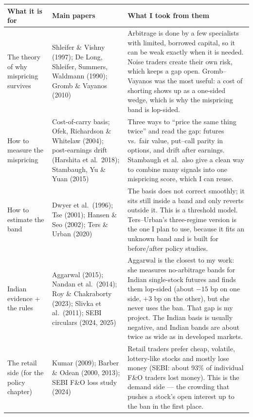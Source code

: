 \documentclass[11pt]{article}
\begin{document}
\begin{center}
\footnotesize
\begin{tabular}{p{2.9cm} p{4.1cm} p{7.1cm}}
\toprule
\textbf{What it is for} & \textbf{Main papers} & \textbf{What I took from them} \\
\midrule
The theory of why mispricing survives & Shleifer \& Vishny (1997); De Long, Shleifer, Summers, Waldmann (1990); Gromb \& Vayanos (2010) & Arbitrage is done by a few specialists with limited, borrowed capital, so it can be weak exactly when it is needed. Noise traders create their own risk, which keeps a gap open. Gromb--Vayanos was the most useful: a cost of shorting shows up as a one-sided wedge, which is why the mispricing band is lop-sided. \\
\addlinespace
How to measure the mispricing & Cost-of-carry basis; Ofek, Richardson \& Whitelaw (2004); post-earnings drift (Harshita et al.\ 2018); Stambaugh, Yu \& Yuan (2015) & Three ways to ``price the same thing twice'' and read the gap: futures vs.\ fair value, put--call parity in options, and drift after earnings. Stambaugh et al.\ also give a clean way to combine many signals into one mispricing score, which I can reuse. \\
\addlinespace
How to estimate the band & Dwyer et al.\ (1996); Tse (2001); Hansen \& Seo (2002); Ters \& Urban (2020) & The basis does not correct smoothly; it sits still inside a band and only reverts outside it. This is a threshold model. Ters--Urban's three-regime version is the one I plan to use, because it fits an unknown band and is built for before/after policy studies. \\
\addlinespace
Indian evidence + the rules & Aggarwal (2015); Nandan et al.\ (2014); Roy \& Chakraborty (2023); Slivka et al.\ (2011); SEBI circulars (2024, 2025) & Aggarwal is the closest to my work: she measures no-arbitrage bands for Indian single-stock futures and finds them lop-sided (about $-15$ bp on one side, $+3$ bp on the other), but she never uses the ban. That gap is my project. The Indian basis is usually negative, and Indian bands are about twice as wide as in developed markets. \\
\addlinespace
The retail side (for the policy chapter) & Kumar (2009); Barber \& Odean (2000, 2013); SEBI F\&O loss study (2024) & Retail traders prefer cheap, volatile, lottery-like stocks and mostly lose money (SEBI: about 93\% of individual F\&O traders lost money). This is the demand side --- the crowding that pushes a stock's open interest up to the ban in the first place. \\
\bottomrule
\end{tabular}
\end{center}
\end{document}
